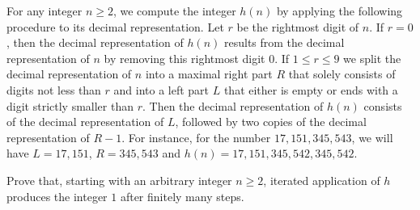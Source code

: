 \item[\textbf{C8.}]
For any integer 
$n\geq 2$, 
 we compute the integer 
$h(n)$
 by applying the following procedure to its decimal representation. Let 
$r$
 be the rightmost digit of 
$n$.
If 
$r=0$, 
 then the decimal representation of 
$h(n)$
 results from the decimal representation of 
$n$
 by removing this rightmost digit 
$0$.
If 
$1\leq r \leq 9$
 we split the decimal representation of 
$n$
 into a maximal right part 
$R$
 that solely consists of digits not less than 
$r$
 and into a left part 
$L$
 that either is empty or ends with a digit strictly smaller than 
$r$.
 Then the decimal representation of 
$h(n)$
 consists of the decimal representation of 
$L$, 
 followed by two copies of the decimal representation of 
$R-1$.
 For instance, for the number 
$17,151,345,543$, 
 we will have 
$L=17,151$, 
$R=345,543$
 and 
$h(n)=17,151,345,542,345,542$.

Prove that, starting with an arbitrary integer 
$n\geq 2$, 
 iterated application of 
$h$
 produces the integer 
$1$
 after finitely many steps.
